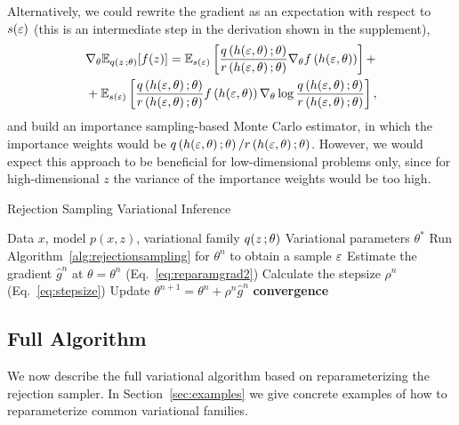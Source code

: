 Alternatively, we could rewrite the gradient as an expectation with respect to $s(\varepsilon)$ (this is an intermediate step in the derivation shown in the supplement),
\begin{align}
&\nabla_\theta \mathbb{E}_{q(z\, ; \theta)}[f(z)] = \mathbb{E}_{s(\varepsilon)}\left[ \frac{q\left(h(\varepsilon,\theta)\, ; \theta\right)}{r\left(h(\varepsilon,\theta)\, ; \theta\right)}  \nabla_\theta f\left(h(\varepsilon,\theta)\right)  \right]+ \nonumber\\
&+\mathbb{E}_{s(\varepsilon)}\left[ \frac{q\left(h(\varepsilon,\theta)\, ; \theta\right)}{r\left(h(\varepsilon,\theta)\, ; \theta\right)}   f\left(h(\varepsilon,\theta)\right) \nabla_\theta \log  \frac{q\left(h(\varepsilon,\theta)\, ; \theta\right)}{r\left(h(\varepsilon,\theta)\, ; \theta\right)}  \right],\nonumber
\end{align}
and build an importance sampling-based Monte Carlo estimator, in which the importance weights would be $q\left(h(\varepsilon,\theta)\, ; \theta\right) / r\left(h(\varepsilon,\theta)\, ; \theta\right)$.
However, we would expect this approach to be beneficial for low-dimensional problems only, since for high-dimensional $z$ the variance of the importance weights would be too high.


\begin{algorithm}
\caption{Rejection Sampling Variational Inference}\label{alg:svi}
\begin{algorithmic}[1]
\REQUIRE Data $x$, model $p(x,z)$, variational family $q(z\, ; \theta)$
\ENSURE Variational parameters $\theta^*$
\REPEAT
\STATE Run Algorithm~\ref{alg:rejectionsampling} for $\theta^n$ to obtain a sample $\varepsilon$
\STATE Estimate the gradient $\hat g^n$ at $\theta = \theta^n$ (Eq.~\ref{eq:reparamgrad2})
\STATE Calculate the stepsize $\rho^n$ (Eq.~\ref{eq:stepsize})
\STATE Update $\theta^{n+1} = \theta^n + \rho^n \hat{g}^n$
\UNTIL \textbf{convergence}
\end{algorithmic}
\end{algorithm}

\subsection{Full Algorithm}
We now describe the full variational algorithm based on reparameterizing the rejection sampler. In Section~\ref{sec:examples} we give concrete examples of how to reparameterize common variational families.

